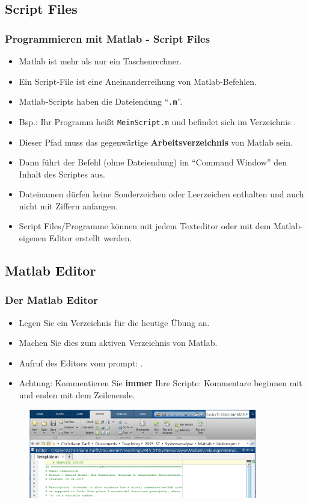     \subsection{Script Files}
    \begin{frame}
        \frametitle{Programmieren mit Matlab - Script Files}
        \begin{itemize}
            \item Matlab ist mehr als nur ein Taschenrechner.
            \item Ein Script-File ist eine Aneinanderreihung von Matlab-Befehlen.
            \item Matlab-Scripts haben die Dateiendung ``\texttt{.m}''.
            \item Bsp.: Ihr Programm heißt \texttt{MeinScript.m} und befindet sich im Verzeichnis .
            \item Dieser Pfad muss das gegenwärtige \textbf{Arbeitsverzeichnis} von Matlab sein.
            \item Dann führt der Befehl  (ohne Dateiendung) im ``Command Window'' den Inhalt des Scriptes aus.
            \item Dateinamen dürfen keine Sonderzeichen oder Leerzeichen enthalten und auch nicht mit Ziffern anfangen.
            \item Script Files/Programme können mit jedem Texteditor oder mit dem Matlab-eigenen Editor erstellt werden.
          \end{itemize}
      \end{frame}

      \subsection{Matlab Editor}
      \begin{frame}
          \frametitle{Der Matlab Editor}
          \begin{itemize}
              \item Legen Sie ein Verzeichnis für die heutige Übung an.
              \item Machen Sie dies zum aktiven Verzeichnis von Matlab.
              \item Aufruf des Editors vom prompt: .
              \item \alert{Achtung}: Kommentieren Sie \textbf{immer} Ihre Scripte: Kommentare beginnen mit \matlabInput{\%} und enden mit dem Zeilenende.
          \end{itemize}

          \begin{figure}
            \includegraphics[width=10.0cm]{matlab_gui.png}
          \end{figure}
      \end{frame}

